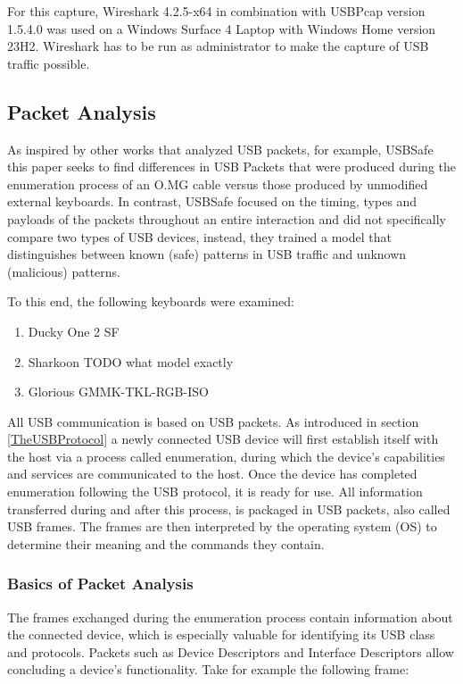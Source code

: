 For this capture, Wireshark 4.2.5-x64 in combination with USBPcap version 1.5.4.0 was used on a Windows Surface 4 Laptop with Windows Home version 23H2. Wireshark has to be run as administrator to make the capture of USB traffic possible.


\subsection{Packet Analysis}\label{Packet Analysis}


As inspired by other works that analyzed USB packets, for example, USBSafe \cite{kharrazUSBESAFEEndPointSolution2019} this paper seeks to find differences in USB Packets that were produced during the enumeration process of an O.MG cable versus those produced by unmodified external keyboards. In contrast, USBSafe focused on the timing, types and payloads of the packets throughout an entire interaction and did not specifically compare two types of USB devices, instead, they trained a model that distinguishes between known (safe) patterns in USB traffic and unknown (malicious) patterns. 

To this end, the following keyboards were examined:
\begin{enumerate}
    \item Ducky One 2 SF
    \item Sharkoon TODO what model exactly
    \item Glorious GMMK-TKL-RGB-ISO
\end{enumerate}


All USB communication is based on USB packets. As introduced in section \ref{TheUSBProtocol} a newly connected USB device will first establish itself with the host via a process called enumeration, during which the device's capabilities and services are communicated to the host. Once the device has completed enumeration following the USB protocol, it is ready for use.
All information transferred during and after this process, is packaged in USB packets, also called USB frames. The frames are then interpreted by the operating system (OS) to determine their meaning and the commands they contain.



\subsubsection{Basics of Packet Analysis}

The frames exchanged during the enumeration process contain information about the connected device, which is especially valuable for identifying its USB class and protocols.
Packets such as Device Descriptors and Interface Descriptors allow concluding a device's functionality. Take for example the following frame:

